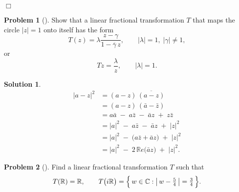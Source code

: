 \documentclass[12pt]{article}
\theoremstyle{definition} %
\newtheorem{solution}{Solution}
\newtheorem{problem}{Problem}
\theoremstyle{plain} %
\begin{document}
\bigskip
\centerline{\(\Box\)}
\pagebreak
\begin{problem}[]
  Show that a linear fractional transformation $T$ that maps the circle $|z| = 1$ onto itself has the form
  \[
      T(z) = \lambda \frac{z - \gamma}{1 - \overline{\gamma}\,z}, 
      \qquad |\lambda| = 1,\; |\gamma| \ne 1,
  \]
  or
  \[
      Tz = \frac{\lambda}{z}, 
      \qquad |\lambda| = 1.
  \] 
\end{problem}
\begin{solution}
  \[
\begin{aligned}
|a-z|^{2}
      &= (a-z)\,\overline{(a-z)} \\[4pt]
      &= (a-z)\,(\bar a-\bar z) \\[4pt]
      &= a\bar a \;-\; a\bar z \;-\; \bar a z \;+\; z\bar z \\[4pt]
      &= |a|^{2} \;-\; a\bar z \;-\; \bar a z \;+\; |z|^{2} \\[4pt]
      &= |a|^{2} \;-\; \bigl(a\bar z+\bar a z\bigr) \;+\; |z|^{2} \\[4pt]
      &= |a|^{2} \;-\; 2\,\mathbb{R}e\!\bigl(\bar a z\bigr) \;+\; |z|^{2}.
\end{aligned}
\]
\end{solution}
\begin{problem}[]
Find a linear fractional transformation $T$ such that
\[
    T(\mathbb{R}) = \mathbb{R},
    \qquad
    T\bigl(i\mathbb{R}\bigr)
        = \Bigl\{\,w\in\mathbb{C} : \bigl|\,w-\tfrac54\,\bigr| = \tfrac34\,\Bigr\}.
\] 
\end{problem}
\end{document}
